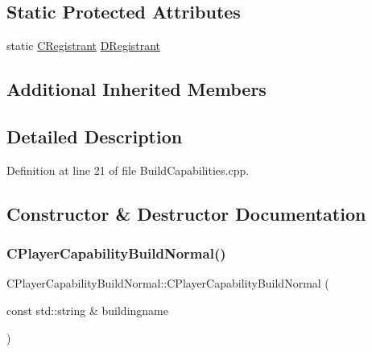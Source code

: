 \subsection*{Static Protected Attributes}
\begin{DoxyCompactItemize}
\item 
static \hyperlink{classCPlayerCapabilityBuildNormal_1_1CRegistrant}{C\+Registrant} \hyperlink{classCPlayerCapabilityBuildNormal_a486700cf2553e6ab77340152c9b03242}{D\+Registrant}
\end{DoxyCompactItemize}
\subsection*{Additional Inherited Members}


\subsection{Detailed Description}


Definition at line 21 of file Build\+Capabilities.\+cpp.



\subsection{Constructor \& Destructor Documentation}
\hypertarget{classCPlayerCapabilityBuildNormal_a36157bf1a2875f0831b646dd2313a464}{}\label{classCPlayerCapabilityBuildNormal_a36157bf1a2875f0831b646dd2313a464} 
\subsubsection{\texorpdfstring{C\+Player\+Capability\+Build\+Normal()}{CPlayerCapabilityBuildNormal()}}
{\footnotesize\ttfamily C\+Player\+Capability\+Build\+Normal\+::\+C\+Player\+Capability\+Build\+Normal (\begin{DoxyParamCaption}\item[{const std\+::string \&}]{buildingname }\end{DoxyParamCaption})\hspace{0.3cm}{\ttfamily [protected]}}



